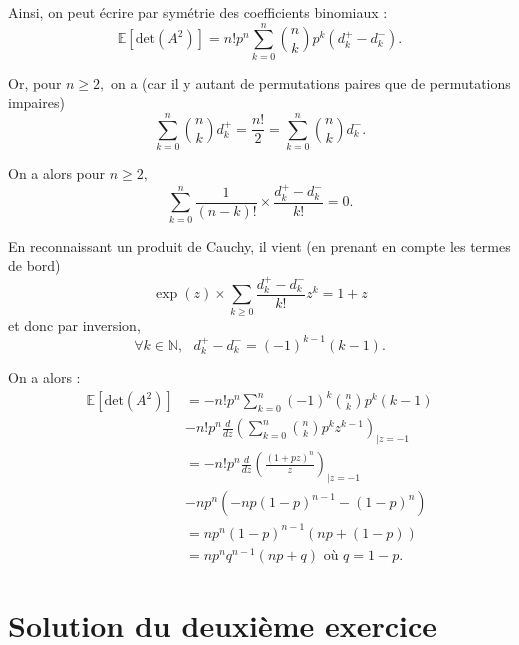 \begin{enumerate}
Ainsi, on peut écrire par symétrie des coefficients binomiaux : $$\mathbb{E}[\mbox{det}(A^{2})] =  n!p^{n}\sum_{k=0}^{n}\binom{n}{k}p^{k}\left(d_{k}^{+}-d_{k}^{-}\right).$$

Or, pour $n\geq 2,$ on a (car il y autant de permutations paires que de permutations impaires) $$\sum_{k=0}^{n}\binom{n}{k}d_{k}^{+}=\frac{n!}{2}=\sum_{k=0}^{n}\binom{n}{k}d_{k}^{-}.$$

On a alors pour $n\geq 2,$ $$\sum_{k=0}^{n}\frac{1}{(n-k)!}\times \frac{d_{k}^{+}-d_{k}^{-}}{k!}=0.$$

En reconnaissant un produit de Cauchy, il vient (en prenant en compte les termes de bord) 
$$\exp(z)\times \sum_{k\geq 0}\frac{d_{k}^{+}-d_{k}^{-}}{k!}z^{k}=1+z$$ et donc par inversion, $$\forall k\in\mathbb{N},\mbox{ } d_{k}^{+}-d_{k}^{-}=(-1)^{k-1}(k-1).$$

On a alors :
\begin{align*}
\mathbb{E}[\mbox{det}(A^{2})] & =  -n!p^{n}\sum_{k=0}^{n}(-1)^{k}\binom{n}{k}p^{k}(k-1)\\
& -n!p^{n}\frac{d}{dz}\left(\sum_{k=0}^{n}\binom{n}{k}p^{k}z^{k-1}\right)_{|z=-1}\\
& = -n!p^{n}\frac{d}{dz}\left(\frac{(1+pz)^{n}}{z}\right)_{|z=-1}\\
& -np^{n}\left(-np(1-p)^{n-1}-(1-p)^{n}\right)\\
& =np^{n}(1-p)^{n-1}(np+(1-p))\\
& = np^{n}q^{n-1}(np+q) \mbox{ où } q=1-p.
\end{align*}

\end{enumerate}

\section{Solution du deuxième exercice}

